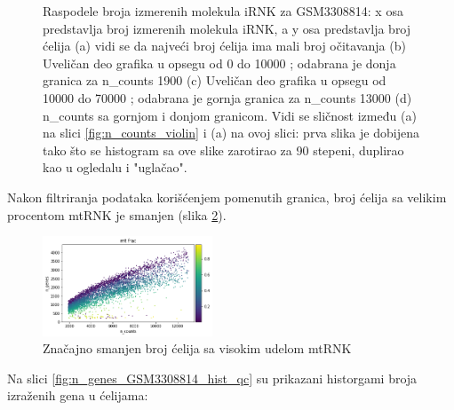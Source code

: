 \documentclass{article}
\begin{document}
\begin{figure}[!h]
    \caption{ Raspodele broja izmerenih molekula iRNK za GSM3308814: x osa predstavlja broj izmerenih molekula iRNK, a y osa predstavlja broj ćelija (a) vidi se da najveći broj ćelija ima mali broj očitavanja (b) Uveličan deo grafika u opsegu od 0 do 10000 ; odabrana je donja granica za n\_counts 1900 (c) Uveličan deo grafika u opsegu od 10000 do 70000 ; odabrana je gornja granica za n\_counts 13000 (d) n\_counts sa gornjom i donjom granicom. Vidi se sličnost između (a) na slici \ref{fig:n_counts_violin} i (a) na ovoj slici: prva slika je dobijena tako što se histogram sa ove slike zarotirao za 90 stepeni, duplirao kao u ogledalu i "uglačao". }
    \label{fig:n_counts_GSM3308814_hist_qc}
\end{figure}


Nakon filtriranja podataka korišćenjem pomenutih granica, broj ćelija sa velikim procentom mtRNK je smanjen (slika \ref{fig:mt_frac_GSM14_after_filtering}). 

\begin{figure}[!ht]
    \centering
    \includegraphics[width=0.45\textwidth]{GSM3308814-genes-counts-filtered.png}
    \caption{ Značajno smanjen broj ćelija sa visokim udelom mtRNK }
    \label{fig:mt_frac_GSM14_after_filtering}
\end{figure}

Na slici \ref{fig:n_genes_GSM3308814_hist_qc} su prikazani historgami broja izraženih gena u ćelijama:
\end{document}
